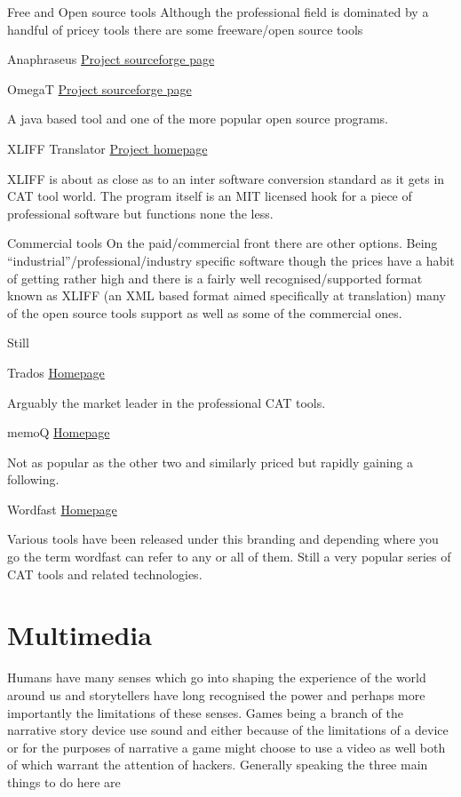 \documentclass[
]{book}
\begin{document}
Free and Open source tools Although the professional field is dominated by a handful of pricey tools there are some freeware/open source tools

Anaphraseus \href{http://sourceforge.net/projects/anaphraseus/?source=recommended}{Project sourceforge page}

OmegaT \href{http://sourceforge.net/projects/omegat/?source=recommended}{Project sourceforge page}

A java based tool and one of the more popular open source programs.

XLIFF Translator \href{http://felix-cat.com/tools/xliff-translator/}{Project homepage}

XLIFF is about as close as to an inter software conversion standard as it gets in CAT tool world. The program itself is an MIT licensed hook for a piece of professional software but functions none the less.

Commercial tools On the paid/commercial front there are other options. Being ``industrial''/professional/industry specific software though the prices have a habit of getting rather high and there is a fairly well recognised/supported format known as XLIFF (an XML based format aimed specifically at translation) many of the open source tools support as well as some of the commercial ones.

Still

Trados \href{http://www.trados.com/en/freelance-translators/default.asp}{Homepage}

Arguably the market leader in the professional CAT tools.

memoQ \href{http://kilgray.com/products/memoq}{Homepage}

Not as popular as the other two and similarly priced but rapidly gaining a following.

Wordfast \href{http://www.wordfast.net/}{Homepage}

Various tools have been released under this branding and depending where you go the term wordfast can refer to any or all of them. Still a very popular series of CAT tools and related technologies.

\hypertarget{multimedia}{%
\chapter{Multimedia}\label{multimedia}}

Humans have many senses which go into shaping the experience of the world around us and storytellers have long recognised the power and perhaps more importantly the limitations of these senses. Games being a branch of the narrative story device use sound and either because of the limitations of a device or for the purposes of narrative a game might choose to use a video as well both of which warrant the attention of hackers. Generally speaking the three main things to do here are
\end{document}
